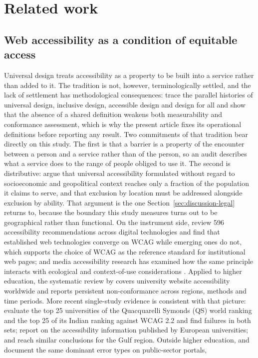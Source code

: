 \documentclass[pdflatex,sn-basic,Numbered,iicol]{sn-jnl}
\theoremstyle{thmstyleone}
\theoremstyle{thmstyletwo}
\theoremstyle{thmstylethree}
\begin{document}
\section{Related work}\label{sec:related}

\subsection{Web accessibility as a condition of equitable access}\label{sec:related-a11y}

Universal design treats accessibility as a property to be built into a service rather than added to it. The tradition is not, however, terminologically settled, and the lack of settlement has methodological consequences: \citet{persson2015universal} trace the parallel histories of universal design, inclusive design, accessible design and design for all and show that the absence of a shared definition weakens both measurability and conformance assessment, which is why the present article fixes its operational definitions before reporting any result. Two commitments of that tradition bear directly on this study. The first is that a barrier is a property of the encounter between a person and a service rather than of the person, so an audit describes what a service does to the range of people obliged to use it. The second is distributive: \citet{abascal2016rethinking} argue that universal accessibility formulated without regard to socioeconomic and geopolitical context reaches only a fraction of the population it claims to serve, and that exclusion by location must be addressed alongside exclusion by ability. That argument is the one Section~\ref{sec:discussion-legal} returns to, because the boundary this study measures turns out to be geographical rather than functional. On the instrument side, \citet{etxabeantia2025characterisation} review 596 accessibility recommendations across digital technologies and find that established web technologies converge on WCAG while emerging ones do not, which supports the choice of WCAG as the reference standard for institutional web pages; and media accessibility research has examined how the same principle interacts with ecological and context-of-use considerations \citep{hermosaramirez2025universal}. Applied to higher education, the systematic review by \citet{campoverdemolina2023accessibility} covers university website accessibility worldwide and reports persistent non-conformance across regions, methods and time periods. More recent single-study evidence is consistent with that picture: \citet{krittika2025accessibility} evaluate the top 25 universities of the Quacquarelli Symonds (QS) world ranking and the top 25 of its Indian ranking against WCAG 2.2 and find failures in both sets; \citet{krejtz2025higher} report on the accessibility information published by European universities; and \citet{fakrudeen2025evaluation} reach similar conclusions for the Gulf region. Outside higher education, \citet{aljedaani2025egovernment} and \citet{iniesto2025service} document the same dominant error types on public-sector portals, 
\end{document}

